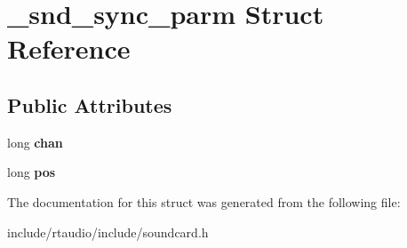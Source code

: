 \hypertarget{struct__snd__sync__parm}{}\section{\+\_\+snd\+\_\+sync\+\_\+parm Struct Reference}
\label{struct__snd__sync__parm}
\subsection*{Public Attributes}
\begin{DoxyCompactItemize}
\item 
long {\bfseries chan}\hypertarget{struct__snd__sync__parm_af6c2ee72700b205cecb888c24d7774f2}{}\label{struct__snd__sync__parm_af6c2ee72700b205cecb888c24d7774f2}

\item 
long {\bfseries pos}\hypertarget{struct__snd__sync__parm_aa6dccff856015b69df1526ebbb92eeb7}{}\label{struct__snd__sync__parm_aa6dccff856015b69df1526ebbb92eeb7}

\end{DoxyCompactItemize}


The documentation for this struct was generated from the following file\+:\begin{DoxyCompactItemize}
\item 
include/rtaudio/include/soundcard.\+h\end{DoxyCompactItemize}

